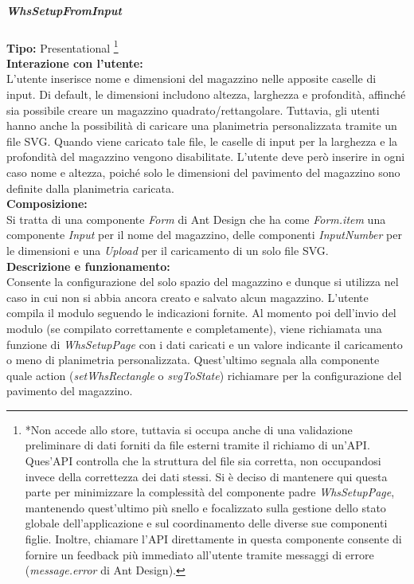 \subparagraph{\colorbox{verde_uml}{WhsSetupFromInput}}
\textbf{Tipo:} Presentational \footnote[*]{\label{footnoteApi}*Non accede allo store, tuttavia si occupa anche di una validazione preliminare di dati forniti da file esterni tramite il richiamo di un'API. Ques'API controlla che la struttura del file sia corretta, non occupandosi invece della correttezza dei dati stessi. Si è deciso di mantenere qui questa parte per minimizzare la complessità del componente padre \textit{WhsSetupPage}, mantenendo quest'ultimo più snello e focalizzato sulla gestione dello stato globale dell'applicazione e sul coordinamento delle diverse sue componenti figlie. Inoltre, chiamare l'API direttamente in questa componente consente di fornire un feedback più immediato all'utente tramite messaggi di errore (\textit{message.error} di Ant Design).} \\
\textbf{Interazione con l'utente:} \\
L'utente inserisce nome e dimensioni del magazzino nelle apposite caselle di input. Di default, le dimensioni includono altezza, larghezza e profondità, affinché sia possibile creare un magazzino quadrato/rettangolare. Tuttavia, gli utenti hanno anche la possibilità di caricare una planimetria personalizzata tramite un file SVG. Quando viene caricato tale file, le caselle di input per la larghezza e la profondità del magazzino vengono disabilitate. L'utente deve però inserire in ogni caso nome e altezza, poiché solo le dimensioni del pavimento del magazzino sono definite dalla planimetria caricata.  \\
\textbf{Composizione:} \\
Si tratta di una componente \textit{Form} di Ant Design che ha come \textit{Form.item} una componente \textit{Input} per il nome del magazzino, delle componenti \textit{InputNumber} per le dimensioni e una \textit{Upload} per il caricamento di un solo file SVG. \\
\textbf{Descrizione e funzionamento:} \\
Consente la configurazione del solo spazio del magazzino e dunque si utilizza nel caso in cui non si abbia ancora creato e salvato alcun magazzino.
L'utente compila il modulo seguendo le indicazioni fornite. Al momento poi dell'invio del modulo (se compilato correttamente e completamente), viene richiamata una funzione di \textit{WhsSetupPage} con i dati caricati e un valore indicante il caricamento o meno di planimetria personalizzata. Quest'ultimo segnala alla componente quale action (\textit{setWhsRectangle} o \textit{svgToState}) richiamare per la configurazione del pavimento del magazzino. 


